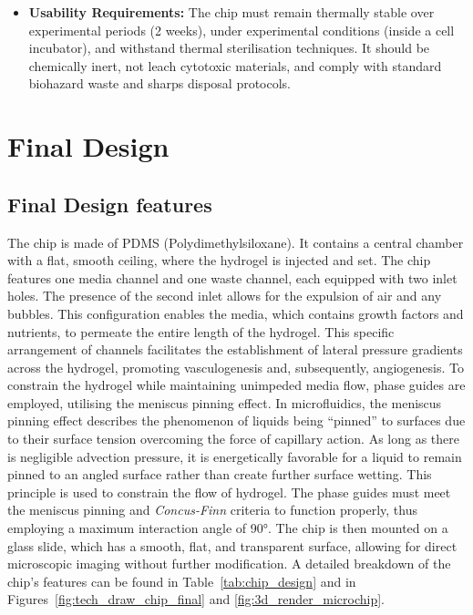 \documentclass[letterpaper,12pt]{article}
\begin{document}
\begin{itemize}
    \item \textbf{Usability Requirements:} The chip must remain thermally stable over experimental periods (2 weeks), under experimental conditions (inside a cell incubator), and withstand thermal sterilisation techniques. It should be chemically inert, not leach cytotoxic materials, and comply with standard biohazard waste and sharps disposal protocols. 

\end{itemize}

\newpage
\section{Final Design}
\subsection{Final Design features}

The chip is made of PDMS (Polydimethylsiloxane). It contains a central chamber with a flat, smooth ceiling, where the hydrogel is injected and set. The chip features one media channel and one waste channel, each equipped with two inlet holes. The presence of the second inlet allows for the expulsion of air and any bubbles. This configuration enables the media, which contains growth factors and nutrients, to permeate the entire length of the hydrogel. This specific arrangement of channels facilitates the establishment of lateral pressure gradients across the hydrogel, promoting vasculogenesis and, subsequently, angiogenesis. To constrain the hydrogel while maintaining unimpeded media flow, phase guides are employed, utilising the meniscus pinning effect\parencite{vulto_2011_phaseguides}. In microfluidics, the meniscus pinning effect describes the phenomenon of liquids being “pinned” to surfaces due to their surface tension overcoming the force of capillary action\parencite{wetting_forces}. As long as there is negligible advection pressure, it is energetically favorable for a liquid to remain pinned to an angled surface rather than create further surface wetting. This principle is used to constrain the flow of hydrogel\parencite{wetting_forces}. The phase guides must meet the meniscus pinning and \textit{Concus-Finn} criteria to function properly, thus employing a maximum interaction angle of 90°. The chip is then mounted on a glass slide, which has a smooth, flat, and transparent surface, allowing for direct microscopic imaging without further modification. A detailed breakdown of the chip’s features can be found in Table~\ref{tab:chip_design} and in Figures~\ref{fig:tech_draw_chip_final} and \ref{fig:3d_render_microchip}.
\end{document}
